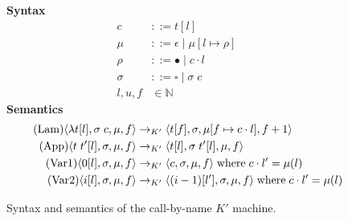 \begin{figure*}
\textbf{Syntax}
\begin{align*}
\tag{Closure} c &::= t [l] \\
\tag{Heap} \mu &::= \epsilon \; | \; \mu [ l \mapsto \rho ] \\
\tag{Environment} \rho &::= \bullet \; | \; c \cdot l \\
\tag{Stack} \sigma &::= \square \; | \; \sigma \; c \\
\tag{Location} l,u,f &\in \mathbb{N}
\end{align*}
\textbf{Semantics}
\begin{align*}
\tag{Lam}
\langle \lambda t[l], \sigma \; c, \mu, f \rangle 
  &\rightarrow_{K'}
\langle t[f], \sigma, \mu[f \mapsto c \cdot l], f+1 \rangle  \\
\tag{App}
\langle t \; t'[l], \sigma, \mu, f \rangle
  &\rightarrow_{K'}
\langle t[l], \sigma \; t'[l], \mu, f \rangle \\
\tag{Var1}
\langle 0[l], \sigma, \mu, f \rangle
  &\rightarrow_{K'}
\langle c, \sigma, \mu, f \rangle 
\; \textnormal{where} \; c \cdot l' = \mu(l)\\
\tag{Var2}
\langle i[l], \sigma, \mu, f \rangle
  &\rightarrow_{K'}
\langle (i-1)[l'], \sigma, \mu, f \rangle
\; \textnormal{where} \; c \cdot l' = \mu(l) \\
\end{align*}
\caption{Syntax and semantics of the call-by-name $K'$ machine.}
\label{fig:K'}
\end{figure*}
